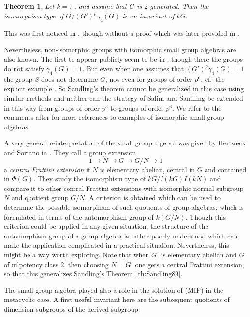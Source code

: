 \documentclass[11pt, a4paper]{amsart}
\newtheorem{theorem}{Theorem}[section]
\theoremstyle{definition}
\begin{document}
\begin{theorem} 
Let $k = \mathbb{F}_p$ and assume that $G$ is $2$-generated. Then the isomorphism type of $G/(G')^p\gamma_4(G)$ is an invariant of $kG$.
\end{theorem}

This was first noticed in \cite{Baginski99}, though without a proof which was later provided in \cite{MargolisMoede}.

Nevertheless, non-isomorphic groups with isomorphic small group algebras are also known. The first to appear publicly seem to be in \cite{Baginski99}, though there the groups do not satisfy $\gamma_4(G) = 1$. But even when one assumes that $(G')^p\gamma_4(G) =1$ the group $S$ does not determine $G$, not even for groups of order $p^6$, cf.\ the explicit example \cite[Example 3.11]{MargolisStanojkovski21}. So Sandling's theorem cannot be generalized in this case using similar methods and neither can the strategy of Salim and Sandling be extended in this way from groups of order $p^5$ to groups of order $p^6$. We refer to the comments after \cite[Example 3.11]{MargolisStanojkovski21} for more references to examples of isomorphic small group algebras.

A very general reinterpretation of the small group algebra was given by Hertweck and Soriano in \cite{HertweckSorianoFrattini}. They call a group extension
\[1 \longrightarrow N \longrightarrow G \longrightarrow G/N \longrightarrow 1 \]
a \emph{central Frattini extension} if $N$ is elementary abelian, central in $G$ and contained in $\Phi(G)$. They study the isomorphism type of $kG/I(kG)I(kN)$ and compare it to other central Frattini extensions with isomorphic normal subgroup $N$ and quotient group $G/N$. A criterion is obtained which can be used to determine the possible isomorphism of such quotients of group algebras, which is formulated in terms of the automorphism group of $k(G/N)$. Though this criterion could be applied in any given situation, the structure of the automorphism group of a group algebra is rather poorly understood which can make the application complicated in a practical situation. Nevertheless, this might be a way worth exploring. Note that when $G'$ is elementary abelian and $G$ of nilpotency class $2$, then choosing $N = G'$ one gets a central Frattini extension, so that this generalizes Sandling's Theorem~\ref{th:Sandling89}. 

The small group algebra played also a role in the solution of (MIP) in the metacyclic case. A first useful invariant here are the subsequent quotients of dimension subgroups of the derived subgroup:
\end{document}

